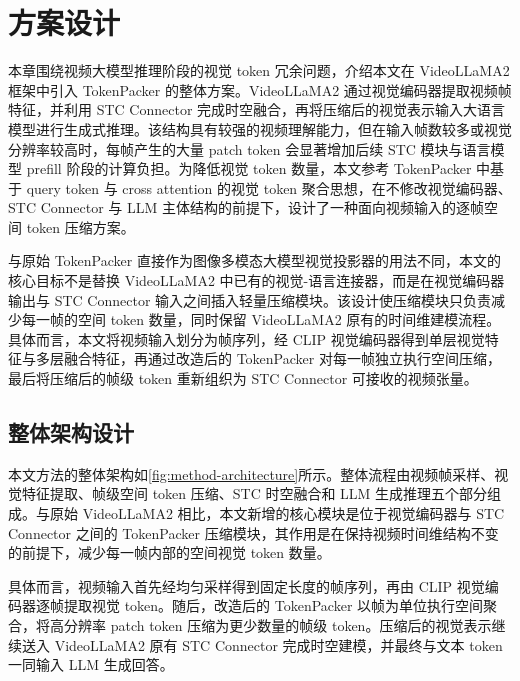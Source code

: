 \cleardoublepage

\section{方案设计}

\par 本章围绕视频大模型推理阶段的视觉 token 冗余问题，介绍本文在 VideoLLaMA2 框架中引入 TokenPacker 的整体方案。VideoLLaMA2 通过视觉编码器提取视频帧特征，并利用 STC Connector 完成时空融合，再将压缩后的视觉表示输入大语言模型进行生成式推理\cite{videollama22024}。该结构具有较强的视频理解能力，但在输入帧数较多或视觉分辨率较高时，每帧产生的大量 patch token 会显著增加后续 STC 模块与语言模型 prefill 阶段的计算负担。为降低视觉 token 数量，本文参考 TokenPacker 中基于 query token 与 cross attention 的视觉 token 聚合思想\cite{tokenpacker2024}，在不修改视觉编码器、STC Connector 与 LLM 主体结构的前提下，设计了一种面向视频输入的逐帧空间 token 压缩方案。

\par 与原始 TokenPacker 直接作为图像多模态大模型视觉投影器的用法不同，本文的核心目标不是替换 VideoLLaMA2 中已有的视觉-语言连接器，而是在视觉编码器输出与 STC Connector 输入之间插入轻量压缩模块。该设计使压缩模块只负责减少每一帧的空间 token 数量，同时保留 VideoLLaMA2 原有的时间维建模流程。具体而言，本文将视频输入划分为帧序列，经 CLIP 视觉编码器得到单层视觉特征与多层融合特征，再通过改造后的 TokenPacker 对每一帧独立执行空间压缩，最后将压缩后的帧级 token 重新组织为 STC Connector 可接收的视频张量。

\subsection{整体架构设计}

\par 本文方法的整体架构如\autoref{fig:method-architecture}所示。整体流程由视频帧采样、视觉特征提取、帧级空间 token 压缩、STC 时空融合和 LLM 生成推理五个部分组成。与原始 VideoLLaMA2 相比，本文新增的核心模块是位于视觉编码器与 STC Connector 之间的 TokenPacker 压缩模块，其作用是在保持视频时间维结构不变的前提下，减少每一帧内部的空间视觉 token 数量。

\par 具体而言，视频输入首先经均匀采样得到固定长度的帧序列，再由 CLIP 视觉编码器逐帧提取视觉 token。随后，改造后的 TokenPacker 以帧为单位执行空间聚合，将高分辨率 patch token 压缩为更少数量的帧级 token。压缩后的视觉表示继续送入 VideoLLaMA2 原有 STC Connector 完成时空建模，并最终与文本 token 一同输入 LLM 生成回答。

